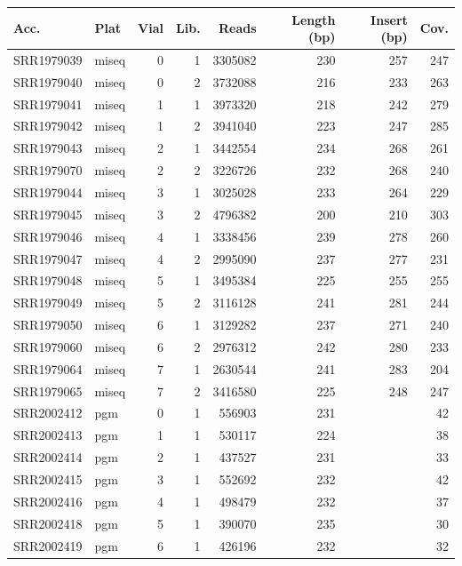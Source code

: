 \documentclass[smallextended]{svjour3}\usepackage[]{graphicx}\usepackage[]{color}
\begin{document}
\begin{table}[ht]
\centering
\begin{tabular}{llrrrrrr}
  \hline
Acc. & Plat & Vial & Lib. & Reads & Length (bp) & Insert (bp) & Cov. \\ 
  \hline
SRR1979039 & miseq & 0 & 1 & 3305082 & 230 & 257 & 247 \\ 
  SRR1979040 & miseq & 0 & 2 & 3732088 & 216 & 233 & 263 \\ 
  SRR1979041 & miseq & 1 & 1 & 3973320 & 218 & 242 & 279 \\ 
  SRR1979042 & miseq & 1 & 2 & 3941040 & 223 & 247 & 285 \\ 
  SRR1979043 & miseq & 2 & 1 & 3442554 & 234 & 268 & 261 \\ 
  SRR1979070 & miseq & 2 & 2 & 3226726 & 232 & 268 & 240 \\ 
  SRR1979044 & miseq & 3 & 1 & 3025028 & 233 & 264 & 229 \\ 
  SRR1979045 & miseq & 3 & 2 & 4796382 & 200 & 210 & 303 \\ 
  SRR1979046 & miseq & 4 & 1 & 3338456 & 239 & 278 & 260 \\ 
  SRR1979047 & miseq & 4 & 2 & 2995090 & 237 & 277 & 231 \\ 
  SRR1979048 & miseq & 5 & 1 & 3495384 & 225 & 255 & 255 \\ 
  SRR1979049 & miseq & 5 & 2 & 3116128 & 241 & 281 & 244 \\ 
  SRR1979050 & miseq & 6 & 1 & 3129282 & 237 & 271 & 240 \\ 
  SRR1979060 & miseq & 6 & 2 & 2976312 & 242 & 280 & 233 \\ 
  SRR1979064 & miseq & 7 & 1 & 2630544 & 241 & 283 & 204 \\ 
  SRR1979065 & miseq & 7 & 2 & 3416580 & 225 & 248 & 247 \\ 
  SRR2002412 & pgm & 0 & 1 & 556903 & 231 &  & 42 \\ 
  SRR2002413 & pgm & 1 & 1 & 530117 & 224 &  & 38 \\ 
  SRR2002414 & pgm & 2 & 1 & 437527 & 231 &  & 33 \\ 
  SRR2002415 & pgm & 3 & 1 & 552692 & 232 &  & 42 \\ 
  SRR2002416 & pgm & 4 & 1 & 498479 & 232 &  & 37 \\ 
  SRR2002418 & pgm & 5 & 1 & 390070 & 235 &  & 30 \\ 
  SRR2002419 & pgm & 6 & 1 & 426196 & 232 &  & 32 \\ 

\end{tabular}
\end{table}
\end{document}
